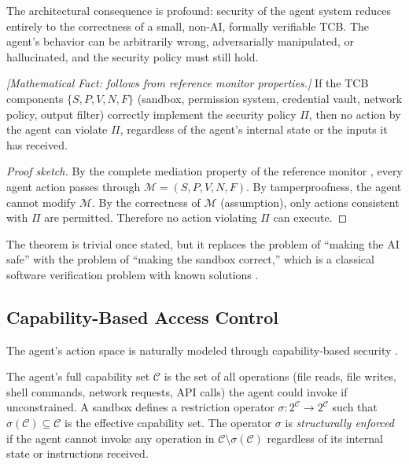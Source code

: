 The architectural consequence is profound: security of the agent system reduces entirely to the correctness of a small, non-AI, formally verifiable TCB. The agent's behavior can be arbitrarily wrong, adversarially manipulated, or hallucinated, and the security policy must still hold.

\begin{theorem}
\emph{[Mathematical Fact: follows from reference monitor properties.]}
\label{thm:tcb-sufficiency}
If the TCB components $\{S, P, V, N, F\}$ (sandbox, permission system, credential vault, network policy, output filter) correctly implement the security policy $\Pi$, then no action by the agent can violate $\Pi$, regardless of the agent's internal state or the inputs it has received.
\end{theorem}

\begin{proof}[Proof sketch]
By the complete mediation property of the reference monitor \citep{anderson1972reference}, every agent action passes through $\mathcal{M} = (S, P, V, N, F)$. By tamperproofness, the agent cannot modify $\mathcal{M}$. By the correctness of $\mathcal{M}$ (assumption), only actions consistent with $\Pi$ are permitted. Therefore no action violating $\Pi$ can execute.
\end{proof}

The theorem is trivial once stated, but it replaces the problem of ``making the AI safe'' with the problem of ``making the sandbox correct,'' which is a classical software verification problem with known solutions \citep{klein2009sel4}.

\subsection{Capability-Based Access Control}

The agent's action space is naturally modeled through capability-based security \citep{dennis1966programming, miller2003myths}.

\begin{definition}
\label{def:capability-sec}
The agent's full capability set $\mathcal{C}$ is the set of all operations (file reads, file writes, shell commands, network requests, API calls) the agent could invoke if unconstrained. A sandbox defines a restriction operator $\sigma: 2^{\mathcal{C}} \to 2^{\mathcal{C}}$ such that $\sigma(\mathcal{C}) \subseteq \mathcal{C}$ is the effective capability set. The operator $\sigma$ is \emph{structurally enforced} if the agent cannot invoke any operation in $\mathcal{C} \setminus \sigma(\mathcal{C})$ regardless of its internal state or instructions received.
\end{definition}

